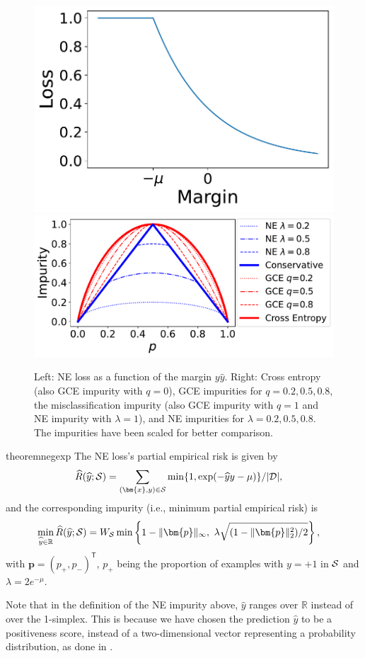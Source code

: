 \documentclass[letterpaper]{article} %
\newcommand{\R}{{\mathbb{R}}}
\newcommand{\bx}{{\bm{x}}}
\newcommand{\bp}{{\bm{p}}}
\newcommand{\T}{{\mathsf{T}}}
\newcommand{\cS}{{\cal{S}}}
\newcommand{\cD}{{\cal{D}}}
\newcommand{\WS}{{W_{\cal{S}}}}
\begin{document}
\begin{figure}[tb]
    \centering
    \includegraphics[height=0.27\linewidth]{figs/negexp.pdf}
    \includegraphics[height=0.27\linewidth]{figs/new_impurities.pdf}
    \caption{Left: NE loss as a function of the margin $y\widehat{y}$.
		Right: Cross entropy (also GCE impurity with $q=0$),
  GCE impurities for $q=0.2, 0.5, 0.8$,
  the misclassification impurity (also GCE impurity with $q=1$ and NE impurity with $\lambda=1$), and
  NE impurities for $\lambda = 0.2, 0.5, 0.8$.
  The impurities have been scaled for better comparison.
  }
    \label{fig:neg-exp}
\end{figure}


\begin{restatable}{theorem}{negexp}
\label{thm:negexp}
	The NE loss's partial empirical risk is given by
	\begin{align*}
		\widehat{R}(\widehat{y};\cS) &= \sum_{(\bx,y)\in\cS} \min\{1,\exp(-\widehat{y}y-\mu)\}/|\cD|,
	\end{align*}
	and the corresponding impurity (i.e., minimum partial empirical risk) is
	\begin{align*}
		\underset{\widehat{y}\in\R}{\min}\, \widehat{R}(\widehat{y};\cS)
		&= \WS \min\left\{
			1-\|\bp\|_\infty,\
			\lambda
			\sqrt{(1-\|\bp\|_2^2)/2}
			\right\},
	\end{align*}
	with $\bp=(p_{+},p_{-})^\T$, $p_{+}$ being the proportion of examples with $y=+1$ in $\cS$ and
 $\lambda=2e^{-\mu}$.
\end{restatable}
Note that in the definition of the NE impurity above, $\widehat{y}$ ranges over $\R$ instead
of over the 1-simplex.
This is because we have chosen the prediction $\widehat{y}$ to be a positiveness score, instead of
a two-dimensional vector representing a probability distribution, as done in
\Cref{sec:background}.
\end{document}
